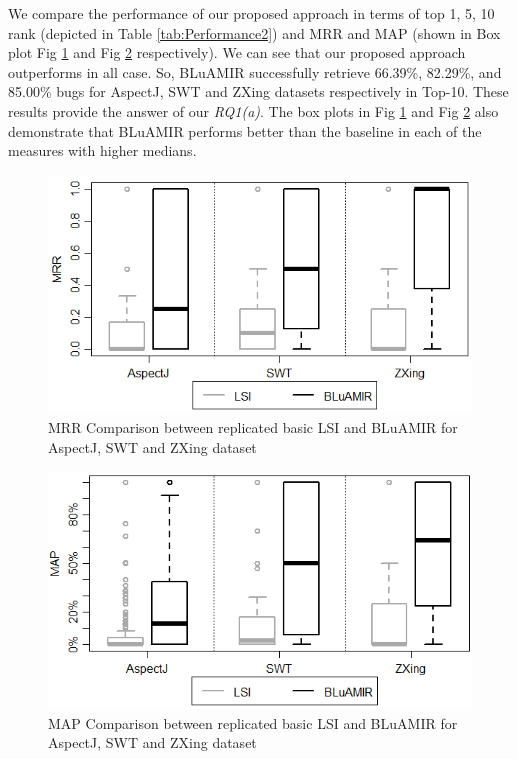 \documentclass[conference]{IEEEtran}
\begin{document}
We compare the performance of our proposed approach in terms of top 1, 5, 10 rank (depicted in Table \ref{tab:Performance2}) and MRR and MAP (shown in Box plot Fig \ref{box:LSI+AssoMRR} and Fig \ref{box:LSI+Asso-MAP} respectively). We can see that our proposed approach outperforms in all case. So, BLuAMIR successfully retrieve 66.39\%, 82.29\%, and 85.00\% bugs for AspectJ, SWT and ZXing datasets respectively in Top-10. These results provide the answer of our \textit{RQ1(a)}. The box plots in Fig \ref{box:LSI+AssoMRR} and Fig \ref{box:LSI+Asso-MAP} also demonstrate that BLuAMIR performs better than the baseline in each of the measures with higher medians.
\begin{figure}
	\centering
	\includegraphics[scale=0.55]{comapre-mrr}
	\caption {MRR Comparison between replicated basic LSI and BLuAMIR for AspectJ, SWT and ZXing dataset}
	\label{box:LSI+AssoMRR}
\end{figure}
\begin{figure}
	\centering
	\includegraphics[scale=0.55]{compare-map-lsi-proposed}
	\caption {MAP Comparison between replicated basic LSI and BLuAMIR for AspectJ, SWT and ZXing dataset}
	\label{box:LSI+Asso-MAP}
\end{figure}
   
\end{document}

